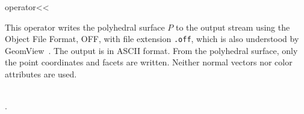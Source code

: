 

\ccHtmlNoClassLinks
\begin{ccRefFunction}{operator<<}
\label{refPolyhedron_operator_leftshift}

\ccDefinition

This operator writes the polyhedral surface $P$ to the output stream
 using the Object File Format, OFF, with file extension 
{\tt .off}, which is also understood by
GeomView~\cite{p-gmgv15-94}. The output is in ASCII format. From the
polyhedral surface, only the point coordinates and facets are
written. Neither normal vectors nor color attributes are used.


  
\ccSeeAlso

\\ 
.


\end{ccRefFunction}



